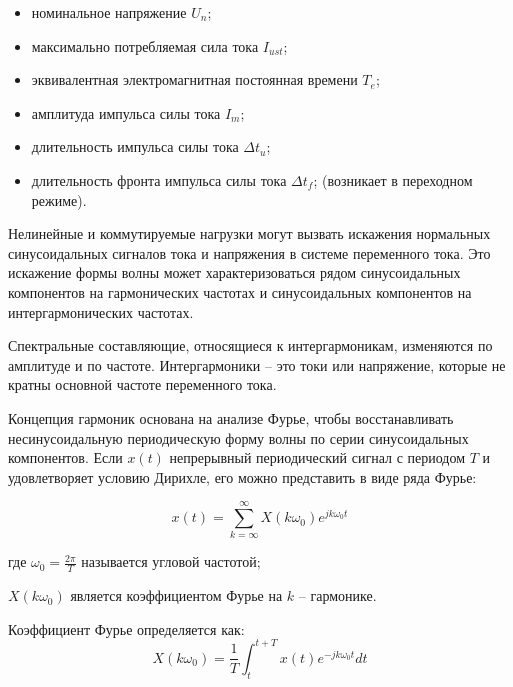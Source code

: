 \begin{itemize}
	\item номинальное напряжение $U_n$;
	
	\item максимально потребляемая сила тока $I_{ust}$;
	
	\item эквивалентная электромагнитная постоянная времени $T_{e}$;
	
	\item амплитуда импульса силы тока $I_m$;
	
	\item длительность импульса силы тока  $\varDelta t_u$;
	
	\item длительность фронта импульса силы тока $\varDelta t_f$;  (возникает в переходном режиме).
\end{itemize}

Нелинейные и коммутируемые нагрузки могут вызвать искажения нормальных синусоидальных сигналов тока и напряжения в системе переменного тока. Это искажение формы волны может характеризоваться рядом синусоидальных компонентов на гармонических частотах и синусоидальных компонентов на интергармонических частотах.
 
Спектральные составляющие, относящиеся к интергармоникам, изменяются по амплитуде и по частоте. Интергармоники – это токи или напряжение, которые не кратны основной частоте переменного тока.

Концепция гармоник основана на анализе Фурье, чтобы восстанавливать несинусоидальную периодическую форму волны по серии синусоидальных компонентов. Если $x(t)$  непрерывный периодический сигнал с периодом $T$ и удовлетворяет условию Дирихле, его можно представить в виде ряда Фурье:

\begin{equation}
	\label{eq:equation1.1}
x(t) = \displaystyle\sum_{k=\infty}^{\infty} X(k \omega_{0}) e^{jk \omega_{0} t}
\end{equation}

где $\omega_0 = \frac{2 \pi}{T}$  называется угловой частотой;
 
$X(k \omega_{0})$ является коэффициентом Фурье на $k$ – гармонике.  

Коэффициент Фурье определяется как:
\begin{equation}
\label{eq:equation1.2}
X(k \omega_{0}) =  \frac{1}{T} \int_t^{t+T} x(t) e^{-jk \omega_{0} t} {d}t
\end{equation}

